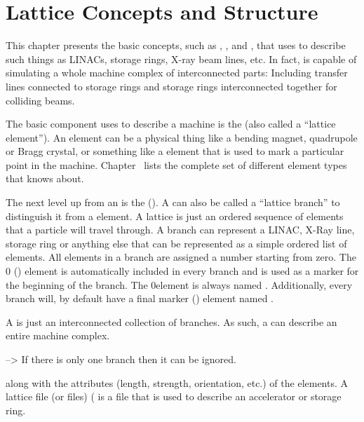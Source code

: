 \chapter{Lattice Concepts and Structure}
\label{c:lat.concepts}

This chapter presents the basic concepts, such as ,
, and , that \bmad uses to describe 
such things as LINACs, storage rings, X-ray beam lines, etc.
In fact, \bmad is capable of 
simulating a whole machine complex of 
interconnected parts: Including transfer lines connected to 
storage rings and storage rings interconnected together for
colliding beams.

The basic component \bmad uses to describe a machine is the
 (also called a ``lattice element''). 
An element can be a physical thing like a bending magnet,
quadrupole or Bragg crystal, or something like a  
element that is used
to mark a particular point in the machine. Chapter~
lists the complete set of different element types that \bmad knows
about.

The next level up from an  is the 
 ().
A  can also be called a ``lattice branch'' to 
distinguish it from a  element.
A lattice  is just an ordered  sequence of elements that a 
particle will travel through. A branch can represent a LINAC, X-Ray
line, storage ring or anything else that can be represented as a 
simple ordered list of elements. All elements in a branch
are assigned a number
starting from zero. The 0\Th {}
() element is automatically included
in every branch and is used as a marker for the beginning of the branch.
The 0\Th element is always named . 
Additionally, every branch will,
by default have a final marker () element named . 

A  is just an interconnected collection of branches. 
As such, a  can describe an entire machine complex.


--> If there is only one branch then it can be ignored.


along with the attributes (length, strength, orientation,
etc.) of the elements.  A lattice file (or files) (
is a file that is used to describe an accelerator or storage ring.



